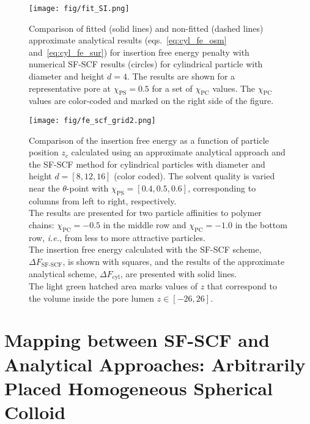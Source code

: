 \documentclass[10pt, a4paper]{article}
\begin{document}
\begin{multicols}{2}
\begin{figure}[H]
    \centering
    \texttt{[image: fig/fit\_SI.png]}
    \caption{
    Comparison of fitted (solid lines) and non-fitted (dashed lines) approximate analytical results (eqs.~\ref{eq:cyl_fe_osm} and~\ref{eq:cyl_fe_sur}) for insertion free energy penalty with numerical SF-SCF results (circles) for cylindrical particle with diameter and height $d = 4$.
    The results are shown for a representative pore at $\chi_{\text{PS}} = 0.5$ for a set of $\chi_{\text{PC}}$ values.
    The $\chi_{\text{PC}}$ values are color-coded and marked on the right side of the figure.
    }
    \label{fig:fit_SI}
\end{figure}

\begin{figure}[H]
    \centering
    \texttt{[image: fig/fe\_scf\_grid2.png]}
    \caption{ 
    Comparison of the insertion free energy as a function of particle position $z_c$ calculated using an approximate analytical approach and the SF-SCF method for cylindrical particles with diameter and height $d = [8, 12, 16]$ (color coded).
    The solvent quality is varied near the $\theta$-point with $\chi_{\text{PS}} = [0.4, 0.5, 0.6]$, corresponding to columns from left to right, respectively.\\
    The results are presented for two particle affinities to polymer chains: $\chi_{\text{PC}} = -0.5$ in the middle row and $\chi_{\text{PC}} = -1.0$ in the bottom row, \emph{i.e.}, from less to more attractive particles.\\
    The insertion free energy calculated with the SF-SCF scheme, $\Delta F_{\text{SF-SCF}}$, is shown with squares, and the results of the approximate analytical scheme, $\Delta F_{\text{cyl}}$, are presented with solid lines.\\
    The light green hatched area marks values of $z$ that correspond to the volume inside the pore lumen $z \in [-26, 26]$.
    \label{fig:fe_scf_grid}
    }
\end{figure}

\end{multicols}

\pagebreak

\section{Mapping between SF-SCF and Analytical Approaches: Arbitrarily Placed Homogeneous Spherical Colloid}
\end{document}
